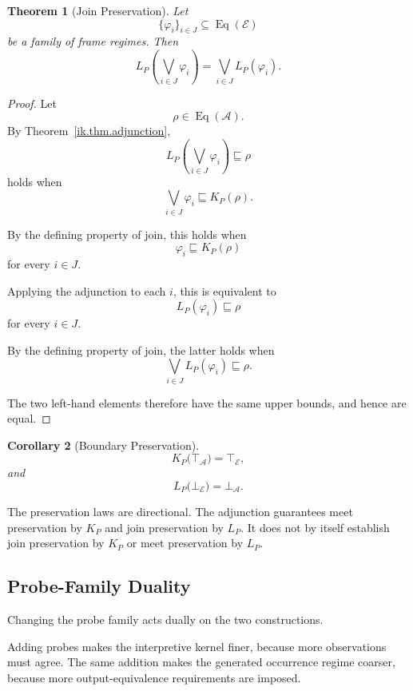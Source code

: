 \documentclass[11pt]{article}
\theoremstyle{plain}
\newtheorem{theorem}{Theorem}[section]
\newtheorem{corollary}[theorem]{Corollary}
\theoremstyle{definition}
\theoremstyle{remark}
\begin{document}
\begin{theorem}[Join Preservation]
  \label{ik.thm.generated-joins}
  Let
  \[
    \{
    \varphi_i
    \}_{i\in J}
    \subseteq
    \operatorname{Eq}(\mathcal{E})
  \]
  be a family of frame regimes.
  Then
  \[
    L_P
    \left(
    \bigvee_{i\in J}
    \varphi_i
    \right)
    =
    \bigvee_{i\in J}
    L_P(\varphi_i).
  \]
\end{theorem}

\begin{proof}
  Let
  \[
    \rho
    \in
    \operatorname{Eq}(\mathcal{A}).
  \]
  By Theorem~\ref{ik.thm.adjunction},
  \[
    L_P
    \left(
    \bigvee_{i\in J}
    \varphi_i
    \right)
    \sqsubseteq
    \rho
  \]
  holds when
  \[
    \bigvee_{i\in J}
    \varphi_i
    \sqsubseteq
    K_P(\rho).
  \]

  By the defining property of join,
  this holds when
  \[
    \varphi_i
    \sqsubseteq
    K_P(\rho)
  \]
  for every \(i\in J\).

  Applying the adjunction to each \(i\),
  this is equivalent to
  \[
    L_P(\varphi_i)
    \sqsubseteq
    \rho
  \]
  for every \(i\in J\).

  By the defining property of join,
  the latter holds when
  \[
    \bigvee_{i\in J}
    L_P(\varphi_i)
    \sqsubseteq
    \rho.
  \]

  The two left-hand elements therefore have
  the same upper bounds,
  and hence are equal.
\end{proof}

\begin{corollary}[Boundary Preservation]
  \label{ik.cor.boundary-preservation}
  \[
    K_P
    \bigl(
    \top_{\mathcal{A}}
    \bigr)
    =
    \top_{\mathcal{E}},
  \]
  and
  \[
    L_P
    \bigl(
    \bot_{\mathcal{E}}
    \bigr)
    =
    \bot_{\mathcal{A}}.
  \]
\end{corollary}

The preservation laws are directional.
The adjunction guarantees meet preservation by \(K_P\)
and join preservation by \(L_P\).
It does not by itself establish
join preservation by \(K_P\)
or meet preservation by \(L_P\).

\subsection{Probe-Family Duality}

Changing the probe family
acts dually on the two constructions.

Adding probes makes the interpretive kernel finer,
because more observations must agree.
The same addition makes the generated occurrence regime coarser,
because more output-equivalence requirements are imposed.
\end{document}
